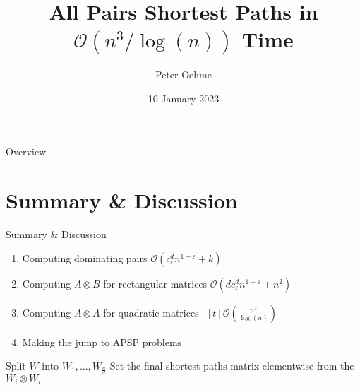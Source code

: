 

\author{Peter Oehme}
\title{All Pairs Shortest Paths in \texorpdfstring{$\mathcal{O}(n^3 / \log(n))$}{O (n \^{} 3 / log (n))} Time}
\date{10 January 2023}




\begin{frame}
    \maketitle
\end{frame}

\begin{frame}{Overview}
    \tableofcontents
\end{frame}







\section*{Summary \& Discussion}

\begin{frame}{Summary \& Discussion}
    \begin{enumerate}
        \item Computing dominating pairs $\mathcal{O}\left( c_\varepsilon^d n^{1 + \varepsilon} + k \right)$
        \item Computing $A \otimes B$ for rectangular matrices $\mathcal{O}\left( d c_\varepsilon^d n^{1 + \varepsilon} + n^2 \right)$
        \item Computing $A \otimes A$ for quadratic matrices $\begin{aligned}[t]\mathcal{O}\left( \frac{n^3}{\log(n)} \right)\end{aligned}$
        \item Making the jump to APSP problems
    \end{enumerate}

    \begin{algorithm}[H]
        Split $W$ into $W_1, \dots, W_{\frac{n}{d}}$\;
        Set the final shortest paths matrix elementwise from the $W_i \otimes W_i$\;
    \end{algorithm}
\end{frame}


